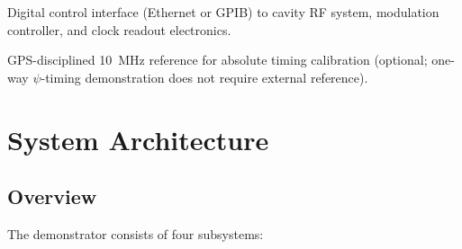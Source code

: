 \documentclass[11pt,onecolumn]{article}
\newcommand{\reqbox}[2]{%
\begin{tcolorbox}[colback=blue!3,colframe=blue!50!black,title={\textbf{REQ-#1:} #2}]
}
\newcommand{\reqend}{\end{tcolorbox}}
\begin{document}
\reqbox{I01}{Data interface}
Digital control interface (Ethernet or GPIB) to cavity RF system,
modulation controller, and clock readout electronics.
\reqend

\reqbox{I02}{Timing interface}
GPS-disciplined 10~MHz reference for absolute timing calibration
(optional; one-way $\psi$-timing demonstration does not require external
reference).
\reqend

\section{System Architecture}

\subsection{Overview}

The demonstrator consists of four subsystems:
\end{document}
